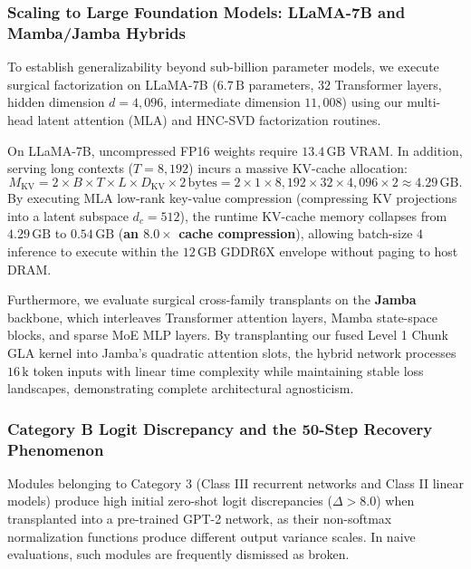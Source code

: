 \subsubsection{Scaling to Large Foundation Models: LLaMA-7B and Mamba/Jamba Hybrids}
\label{sec:results_llama_jamba}

To establish generalizability beyond sub-billion parameter models, we execute surgical factorization on LLaMA-7B ($6.7\,\text{B}$ parameters, $32$ Transformer layers, hidden dimension $d=4{,}096$, intermediate dimension $11{,}008$) using our multi-head latent attention (MLA) and HNC-SVD factorization routines. 

On LLaMA-7B, uncompressed FP16 weights require $13.4\,\text{GB}$ VRAM. In addition, serving long contexts ($T=8{,}192$) incurs a massive KV-cache allocation:
\begin{equation}
\label{eq:kv_cache_size}
M_{\text{KV}} = 2 \times B \times T \times L \times D_{\text{KV}} \times 2\,\text{bytes} = 2 \times 1 \times 8{,}192 \times 32 \times 4{,}096 \times 2 \approx 4.29\,\text{GB}.
\end{equation}
By executing MLA low-rank key-value compression (compressing KV projections into a latent subspace $d_c = 512$), the runtime KV-cache memory collapses from $4.29\,\text{GB}$ to $0.54\,\text{GB}$ (\textbf{an $8.0\times$ cache compression}), allowing batch-size $4$ inference to execute within the $12\,\text{GB}$ GDDR6X envelope without paging to host DRAM.

Furthermore, we evaluate surgical cross-family transplants on the \textbf{Jamba} backbone, which interleaves Transformer attention layers, Mamba state-space blocks, and sparse MoE MLP layers. By transplanting our fused Level 1 Chunk GLA kernel into Jamba's quadratic attention slots, the hybrid network processes $16\,\text{k}$ token inputs with linear time complexity while maintaining stable loss landscapes, demonstrating complete architectural agnosticism.

\subsubsection{Category B Logit Discrepancy and the 50-Step Recovery Phenomenon}
\label{sec:results_category_b_recovery}

Modules belonging to Category 3 (Class III recurrent networks and Class II linear models) produce high initial zero-shot logit discrepancies ($\Delta > 8.0$) when transplanted into a pre-trained GPT-2 network, as their non-softmax normalization functions produce different output variance scales. In naive evaluations, such modules are frequently dismissed as broken.

